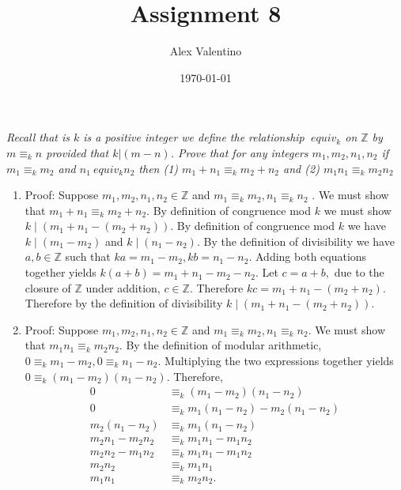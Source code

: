 \documentclass[12pt, letterpaper]{article}
\date{\today}
\author{Alex Valentino}
\title{Assignment 8}
\newcommand{\Z}{\mathbb{Z}}
\begin{document}
	\textit{Recall that is $k$ is a positive integer we define the relationship $\
equiv_k$ on $\mathbb{Z}$  by $m \equiv_k n$ provided that $k|(m-n)$.
Prove that for any  integers $m_1,m_2,n_1,n_2$ if $m_1 \equiv_k m_2$ and $n_1 \
equiv_k n_2$ then
(1) $m_1+n_1 \equiv_k m_2+n_2$
and (2) $m_1n_1 \equiv_k m_2n_2$}
\begin{enumerate}
	\item Proof: Suppose $m_1,m_2,n_1,n_2 \in \Z$ and $m_1 \equiv_k m_2, n_1 \equiv_k n_2$ . We must show that $m_1+n_1 \equiv_k m_2+n_2$.  By definition of congruence mod $k$ we must show $k \mid (m_1 + n_1 - (m_2 + n_2))$.  By definition of congruence mod $k$ we have $k \mid (m_1 - m_2)$ and $k \mid (n_1 - n_2).$  By the definition of divisibility we have $a,b \in \Z$ such that $ka = m_1 - m_2, kb = n_1 - n_2.$  Adding both equations together yields $k(a+b) = m_1+ n_1 - m_2  - n_2.$  Let $c = a+b,$ due to the closure of $\Z$ under addition, $c \in \Z.$  Therefore $kc = m_1+ n_1 - (m_2  + n_2).$  Therefore by the definition of divisibility $k \mid  (m_1+ n_1 - (m_2  + n_2)).$
	\item Proof: Suppose $m_1,m_2,n_1,n_2 \in \Z$ and $m_1 \equiv_k m_2, n_1 \equiv_k n_2$.  We must show that $m_1n_1 \equiv_k m_2n_2$.   By the definition of modular arithmetic, $0 \equiv_k m_1 - m_2, 0 \equiv_k n_1 - n_2.$ Multiplying the two expressions together yields $0 \equiv_k (m_1 - m_2)(n_1 - n_2).$  Therefore, \begin{align*}
	0 &\equiv_k (m_1 - m_2)(n_1 - n_2)\\
	0 &\equiv_k m_1(n_1 - n_2)-m_2(n_1 - n_2)\\
	m_2(n_1 - n_2) &\equiv_k m_1(n_1 - n_2)\\
	m_2 n_1 - m_2 n_2 &\equiv_k m_1 n_1 - m_1 n_2\\
	m_2 n_2 - m_1 n_2 &\equiv_k m_1 n_1 - m_1 n_2\\
	m_2 n_2 &\equiv_k m_1 n_1\\
	m_1 n_1 &\equiv_k m_2 n_2.
	\end{align*}
\end{enumerate}
\end{document}
